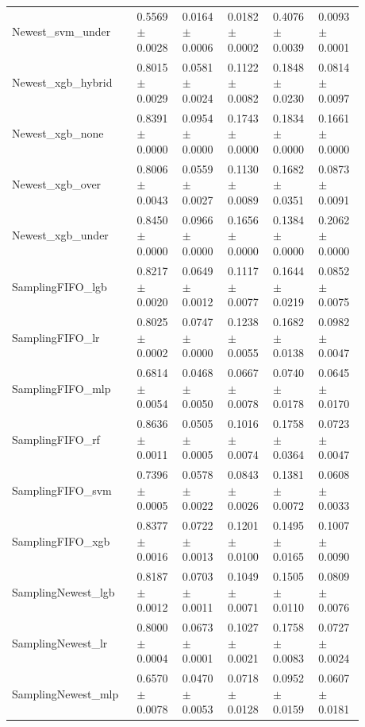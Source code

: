\begin{longtable}{p{0.28\linewidth}p{0.12\linewidth}p{0.12\linewidth}p{0.12\linewidth}p{0.12\linewidth}p{0.12\linewidth}}
Newest\_\allowbreak{}svm\_\allowbreak{}under & 0.5569\(\pm\)0.0028 & 0.0164\(\pm\)0.0006 & 0.0182\(\pm\)0.0002 & 0.4076\(\pm\)0.0039 & 0.0093\(\pm\)0.0001 \\
Newest\_\allowbreak{}xgb\_\allowbreak{}hybrid & 0.8015\(\pm\)0.0029 & 0.0581\(\pm\)0.0024 & 0.1122\(\pm\)0.0082 & 0.1848\(\pm\)0.0230 & 0.0814\(\pm\)0.0097 \\
Newest\_\allowbreak{}xgb\_\allowbreak{}none & 0.8391\(\pm\)0.0000 & 0.0954\(\pm\)0.0000 & 0.1743\(\pm\)0.0000 & 0.1834\(\pm\)0.0000 & 0.1661\(\pm\)0.0000 \\
Newest\_\allowbreak{}xgb\_\allowbreak{}over & 0.8006\(\pm\)0.0043 & 0.0559\(\pm\)0.0027 & 0.1130\(\pm\)0.0089 & 0.1682\(\pm\)0.0351 & 0.0873\(\pm\)0.0091 \\
Newest\_\allowbreak{}xgb\_\allowbreak{}under & 0.8450\(\pm\)0.0000 & 0.0966\(\pm\)0.0000 & 0.1656\(\pm\)0.0000 & 0.1384\(\pm\)0.0000 & 0.2062\(\pm\)0.0000 \\
SamplingFIFO\_\allowbreak{}lgb & 0.8217\(\pm\)0.0020 & 0.0649\(\pm\)0.0012 & 0.1117\(\pm\)0.0077 & 0.1644\(\pm\)0.0219 & 0.0852\(\pm\)0.0075 \\
SamplingFIFO\_\allowbreak{}lr & 0.8025\(\pm\)0.0002 & 0.0747\(\pm\)0.0000 & 0.1238\(\pm\)0.0055 & 0.1682\(\pm\)0.0138 & 0.0982\(\pm\)0.0047 \\
SamplingFIFO\_\allowbreak{}mlp & 0.6814\(\pm\)0.0054 & 0.0468\(\pm\)0.0050 & 0.0667\(\pm\)0.0078 & 0.0740\(\pm\)0.0178 & 0.0645\(\pm\)0.0170 \\
SamplingFIFO\_\allowbreak{}rf & 0.8636\(\pm\)0.0011 & 0.0505\(\pm\)0.0005 & 0.1016\(\pm\)0.0074 & 0.1758\(\pm\)0.0364 & 0.0723\(\pm\)0.0047 \\
SamplingFIFO\_\allowbreak{}svm & 0.7396\(\pm\)0.0005 & 0.0578\(\pm\)0.0022 & 0.0843\(\pm\)0.0026 & 0.1381\(\pm\)0.0072 & 0.0608\(\pm\)0.0033 \\
SamplingFIFO\_\allowbreak{}xgb & 0.8377\(\pm\)0.0016 & 0.0722\(\pm\)0.0013 & 0.1201\(\pm\)0.0100 & 0.1495\(\pm\)0.0165 & 0.1007\(\pm\)0.0090 \\
SamplingNewest\_\allowbreak{}lgb & 0.8187\(\pm\)0.0012 & 0.0703\(\pm\)0.0011 & 0.1049\(\pm\)0.0071 & 0.1505\(\pm\)0.0110 & 0.0809\(\pm\)0.0076 \\
SamplingNewest\_\allowbreak{}lr & 0.8000\(\pm\)0.0004 & 0.0673\(\pm\)0.0001 & 0.1027\(\pm\)0.0021 & 0.1758\(\pm\)0.0083 & 0.0727\(\pm\)0.0024 \\
SamplingNewest\_\allowbreak{}mlp & 0.6570\(\pm\)0.0078 & 0.0470\(\pm\)0.0053 & 0.0718\(\pm\)0.0128 & 0.0952\(\pm\)0.0159 & 0.0607\(\pm\)0.0181 \\

\end{longtable}
